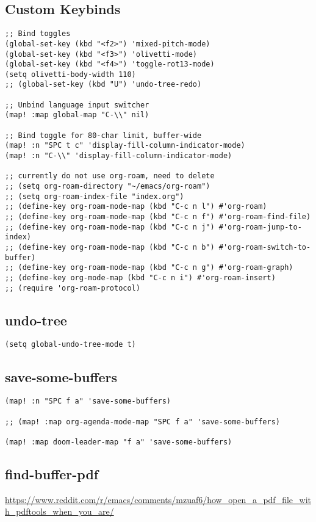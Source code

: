 \documentclass[8pt]{article}
\begin{document}
\subsection{Custom Keybinds}
\label{sec:org0907871}
\begin{verbatim}
;; Bind toggles
(global-set-key (kbd "<f2>") 'mixed-pitch-mode)
(global-set-key (kbd "<f3>") 'olivetti-mode)
(global-set-key (kbd "<f4>") 'toggle-rot13-mode)
(setq olivetti-body-width 110)
;; (global-set-key (kbd "U") 'undo-tree-redo)

;; Unbind language input switcher
(map! :map global-map "C-\\" nil)

;; Bind toggle for 80-char limit, buffer-wide
(map! :n "SPC t c" 'display-fill-column-indicator-mode)
(map! :n "C-\\" 'display-fill-column-indicator-mode)

;; currently do not use org-roam, need to delete
;; (setq org-roam-directory "~/emacs/org-roam")
;; (setq org-roam-index-file "index.org")
;; (define-key org-roam-mode-map (kbd "C-c n l") #'org-roam)
;; (define-key org-roam-mode-map (kbd "C-c n f") #'org-roam-find-file)
;; (define-key org-roam-mode-map (kbd "C-c n j") #'org-roam-jump-to-index)
;; (define-key org-roam-mode-map (kbd "C-c n b") #'org-roam-switch-to-buffer)
;; (define-key org-roam-mode-map (kbd "C-c n g") #'org-roam-graph)
;; (define-key org-mode-map (kbd "C-c n i") #'org-roam-insert)
;; (require 'org-roam-protocol)
\end{verbatim}
\subsection{undo-tree}
\label{sec:org8cc73c5}
\begin{verbatim}
(setq global-undo-tree-mode t)
\end{verbatim}
\subsection{save-some-buffers}
\label{sec:orgb375745}
\begin{verbatim}
(map! :n "SPC f a" 'save-some-buffers)

;; (map! :map org-agenda-mode-map "SPC f a" 'save-some-buffers)

(map! :map doom-leader-map "f a" 'save-some-buffers)
\end{verbatim}
\subsection{find-buffer-pdf}
\label{sec:orga48a7a1}
\url{https://www.reddit.com/r/emacs/comments/mzuaf6/how\_open\_a\_pdf\_file\_with\_pdftools\_when\_you\_are/}
\end{document}
